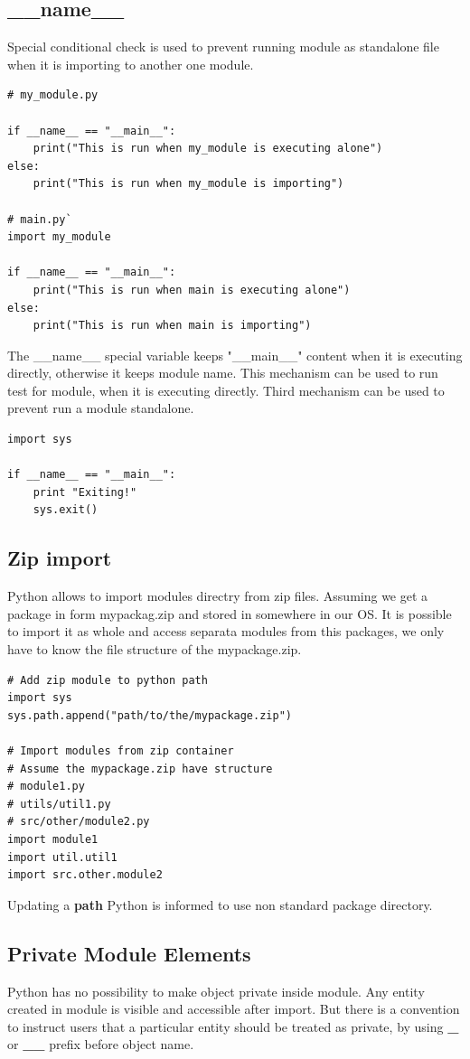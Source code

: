 \documentclass{article}
\begin{document}
\subsection{\_\_name\_\_}
Special conditional check is used to prevent running module as standalone file when it is importing to another one module.
\begin{lstlisting}[style=pystyle]
# my_module.py

if __name__ == "__main__":
	print("This is run when my_module is executing alone")
else:
	print("This is run when my_module is importing")
	
# main.py`
import my_module

if __name__ == "__main__":
	print("This is run when main is executing alone")
else:
	print("This is run when main is importing")
\end{lstlisting}
The \_\_name\_\_ special variable keeps "\_\_main\_\_" content when it is executing directly, otherwise it keeps module name. This mechanism can be used to run test for module, when it is executing directly.
Third mechanism can be used to prevent run a module standalone.
\begin{lstlisting}[style=pystyle]
import sys

if __name__ == "__main__":
    print "Exiting!"
    sys.exit()
\end{lstlisting}

\subsection{Zip import}
Python allows to import modules directry from zip files. Assuming we get a package in form mypackag.zip and stored in somewhere in our OS. It is possible to import it as whole and access separata modules from this packages, we only have to know the file structure of the mypackage.zip. 
\begin{lstlisting}[style=pystyle]
# Add zip module to python path
import sys
sys.path.append("path/to/the/mypackage.zip")

# Import modules from zip container
# Assume the mypackage.zip have structure
# module1.py
# utils/util1.py
# src/other/module2.py
import module1
import util.util1
import src.other.module2
\end{lstlisting}
Updating a \textbf{path} Python is informed to use non standard package directory.

\subsection{Private Module Elements}
Python has no possibility to make object private inside module. Any entity created in module is visible and accessible after import. But there is a convention  to instruct users that a particular entity should be treated as private, by using \textbf{\_} or \textbf{\_\_} prefix before object name.
\end{document}
